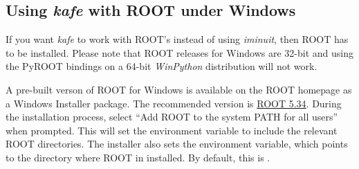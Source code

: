 \documentclass[a4paper,10pt,english]{sphinxmanual}
\begin{document}
\subsection{Using \emph{kafe} with ROOT under Windows}
\label{installation:using-kafe-with-root-under-windows}
If you want \emph{kafe} to work with ROOT's  instead of using
\emph{iminuit}, then ROOT has to be installed. Please note that ROOT releases
for Windows are 32-bit and using the PyROOT bindings on a 64-bit \emph{WinPython}
distribution will not work.

A pre-built verson of ROOT for Windows is available on the ROOT homepage as a Windows
Installer package. The recommended version is
\href{https://root.cern.ch/content/release-53434}{ROOT 5.34}.
During the installation process, select ``Add ROOT to the system PATH for all users''
when prompted. This will set the  environment variable to include
the relevant ROOT directories. The installer also sets the  environment
variable, which points to the directory where ROOT in installed. By default,
this is .
\end{document}

